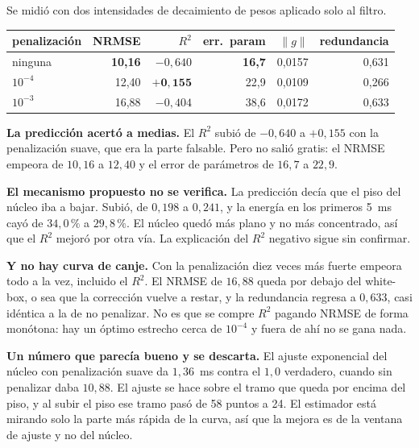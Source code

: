 \documentclass[11pt,a4paper]{article}
\begin{document}
Se midió con dos intensidades de decaimiento de pesos aplicado solo al filtro.

\begin{center}
\small
\begin{tabular}{lrrrrr}
\toprule
\textbf{penalización} & \textbf{NRMSE} & \textbf{$R^2$} &
\textbf{err.\ param} & \textbf{$\lVert g \rVert$} & \textbf{redundancia} \\
\midrule
ninguna     & \textbf{10{,}16} & $-0{,}640$ & \textbf{16{,}7} & 0{,}0157 & 0{,}631 \\
$10^{-4}$   & 12{,}40 & $\mathbf{+0{,}155}$ & 22{,}9 & 0{,}0109 & 0{,}266 \\
$10^{-3}$   & 16{,}88 & $-0{,}404$ & 38{,}6 & 0{,}0172 & 0{,}633 \\
\bottomrule
\end{tabular}
\end{center}

\smallskip\par\textbf{La predicción acertó a medias.} El $R^2$ subió de
$-0{,}640$ a $+0{,}155$ con la penalización suave, que era la parte falsable.
Pero no salió gratis: el NRMSE empeora de $10{,}16$ a $12{,}40$ y el error de
parámetros de $16{,}7$ a $22{,}9$.

\smallskip\par\textbf{El mecanismo propuesto no se verifica.} La predicción
decía que el piso del núcleo iba a bajar. Subió, de $0{,}198$ a $0{,}241$, y la
energía en los primeros 5~ms cayó de $34{,}0\,\%$ a $29{,}8\,\%$. El núcleo
quedó más plano y no más concentrado, así que el $R^2$ mejoró por otra vía. La
explicación del $R^2$ negativo sigue sin confirmar.

\smallskip\par\textbf{Y no hay curva de canje.} Con la penalización diez veces
más fuerte empeora todo a la vez, incluido el $R^2$. El NRMSE de $16{,}88$ queda
por debajo del white-box, o sea que la corrección vuelve a restar, y la
redundancia regresa a $0{,}633$, casi idéntica a la de no penalizar. No es que
se compre $R^2$ pagando NRMSE de forma monótona: hay un óptimo estrecho cerca de
$10^{-4}$ y fuera de ahí no se gana nada.

\smallskip\par\textbf{Un número que parecía bueno y se descarta.} El ajuste
exponencial del núcleo con penalización suave da $1{,}36$~ms contra el $1{,}0$
verdadero, cuando sin penalizar daba $10{,}88$. El ajuste se hace sobre el tramo
que queda por encima del piso, y al subir el piso ese tramo pasó de 58 puntos a
24. El estimador está mirando solo la parte más rápida de la curva, así que la
mejora es de la ventana de ajuste y no del núcleo.
\end{document}
